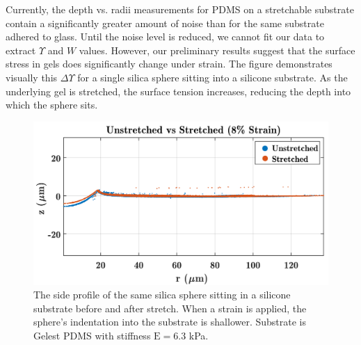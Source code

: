 Currently, the depth vs. radii measurements for PDMS on a stretchable substrate contain a significantly greater amount of noise than for the same substrate adhered to glass. Until the noise level is reduced, we cannot fit our data to extract $ \Upsilon $ and $ W $ values. However, our preliminary results suggest that the surface stress in gels does significantly change under strain. The figure demonstrates visually this $ \Delta\Upsilon $ for a single silica sphere sitting into a silicone substrate. As the underlying gel is stretched, the surface tension increases, reducing the depth into which the sphere sits. 
\begin{figure}[h!]
	\centering
	\includegraphics[width=\linewidth]{Chapters/Figures/sc1_unstretched_v_8ml_cropped}
	\caption[Side Collapse Comparison]{The side profile of the same silica sphere sitting in a silicone substrate before and after stretch. When a strain is applied, the sphere's indentation into the substrate is shallower. Substrate is Gelest PDMS with stiffness $\text{E}=6.3$ kPa.}	
	\label{fig:sc1unstretchedv8ml}
\end{figure}





